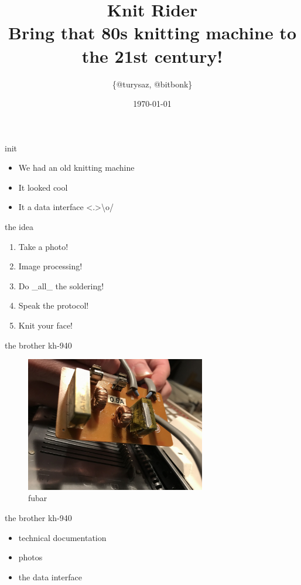 \documentclass{beamer}
\author{\{@turysaz, @bitbonk\}}
\title{\Huge{Knit Rider}\\
    \large{Bring that 80s knitting machine to the 21st century!}
}
\date{\today{}}
\begin{document}
\maketitle

\begin{frame}{init}
    \begin{itemize}[<+->]
        \item We had an old knitting machine
        \item It looked cool
        \item It  a data interface
              \only<.>{\alert{\textbackslash{}o/}}
    \end{itemize}
\end{frame}

\begin{frame}{the idea}
    \begin{enumerate}[<+->]
        \item Take a photo!
        \item Image processing!
        \item Do \_all\_ the soldering!
        \item Speak the protocol!
        \item Knit your face!
    \end{enumerate}
\end{frame}

\begin{frame}{the brother kh-940}
    \begin{figure}
        \includegraphics[width=0.7\textwidth]{./images/exploded-capacitor.png}
        \caption{fubar}
    \end{figure}
\end{frame}

\begin{frame}{the brother kh-940}
    \begin{itemize}%
        \item technical documentation
        \item photos
        \item the data interface
    \end{itemize}
\end{frame}
\end{document}
